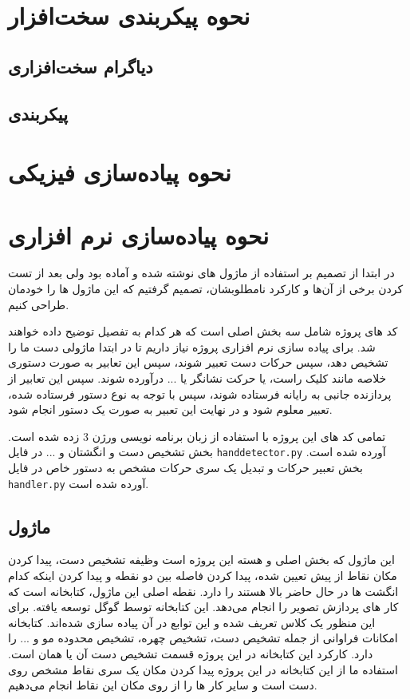 \documentclass{article}
\begin{document}
\section{نحوه پیکر‌بندی سخت‌افزار}
\subsection{دیاگرام سخت‌افزاری}

\subsection{پیکربندی}



\section{نحوه پیاده‌سازی فیزیکی}


\section{نحوه پیاده‌سازی نرم افزاری}
در ابتدا از تصمیم بر استفاده از ماژول های نوشته شده و آماده بود ولی بعد از تست کردن برخی از آن‌ها و کارکرد نامطلوبشان، تصمیم گرفتیم که این ماژول ها را خودمان طراحی کنیم.
 
کد های پروژه شامل سه بخش اصلی است که هر کدام به تفصیل توضیح داده خواهند شد. برای پیاده سازی نرم افزاری پروژه نیاز داریم تا در ابتدا ماژولی دست ما را تشخیص دهد، سپس حرکات دست تعبیر شوند، سپس این تعابیر به صورت دستوری خلاصه مانند کلیک راست، یا حرکت نشانگر یا ... درآورده شوند. سپس این تعابیر از پردازنده جانبی به رایانه فرستاده شوند، سپس با توجه به نوع دستور فرستاده شده، تعبیر   معلوم شود و در نهایت این تعبیر به صورت یک دستور  انجام شود.

تمامی کد های این پروژه با استفاده از زبان برنامه نویسی  ورژن 3 زده شده است. بخش تشخیص دست و انگشتان و ... در فایل
\verb~handdetector.py~
 آورده شده است. بخش تعبیر حرکات و تبدیل یک سری حرکات مشخص به دستور خاص در فایل 
 \verb~handler.py~
  آورده شده است.

\subsection{ماژول }
این ماژول که بخش اصلی و هسته این پروژه است وظیفه تشخیص دست، پیدا کردن مکان نقاط از پیش تعیین شده، پیدا کردن فاصله بین دو نقطه و پیدا کردن اینکه کدام انگشت ها در حال حاضر بالا هستند را دارد.
نقطه اصلی این ماژول، کتابخانه   است که کار های پردازش تصویر را انجام می‌دهد. این کتابخانه توسط گوگل توسعه یافته. برای این منظور یک کلاس  تعریف شده و این توابع در آن پیاده سازی شده‌اند.
کتابخانه  امکانات فراوانی از جمله تشخیص دست، تشخیص چهره، تشخیص محدوده مو و ... را دارد. کارکرد این کتابخانه در این پروژه قسمت تشخیص دست آن یا همان  است. استفاده ما از این کتابخانه در این پروژه پیدا کردن مکان یک سری نقاط مشخص روی دست است و سایر کار ها را از روی مکان این نقاط انجام می‌دهیم.
\end{document}
